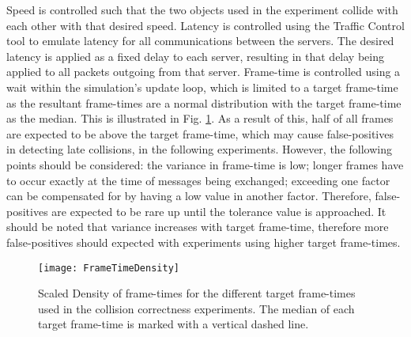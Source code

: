 Speed is controlled such that the two objects used in the experiment collide with each other with that desired speed. Latency is controlled using the Traffic Control tool to emulate latency for all communications between the servers. The desired latency is applied as a fixed delay to each server, resulting in that delay being applied to all packets outgoing from that server. Frame-time is controlled using a wait within the simulation's update loop, which is limited to a target frame-time as the resultant frame-times are a normal distribution with the target frame-time as the median. This is illustrated in Fig. \ref{fig_FrameTimeDensity}. As a result of this, half of all frames are expected to be above the target frame-time, which may cause false-positives in detecting late collisions, in the following experiments. However, the following points should be considered: the variance in frame-time is low; longer frames have to occur exactly at the time of messages being exchanged; exceeding one factor can be compensated for by having a low value in another factor. Therefore, false-positives are expected to be rare up until the tolerance value is approached. It should be noted that variance increases with target frame-time, therefore more false-positives should expected with experiments using higher target frame-times.

\begin{figure}
	\centering
	\texttt{[image: FrameTimeDensity]}
	\caption{Scaled Density of frame-times for the different target frame-times used in the collision correctness experiments. The median of each target frame-time is marked with a vertical dashed line.}
	\label{fig_FrameTimeDensity}
\end{figure}



